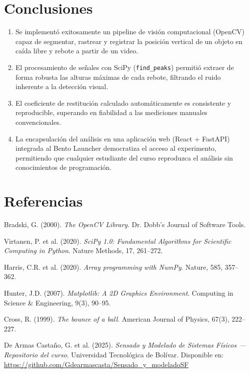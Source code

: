 \documentclass[12pt,a4paper]{article}
\begin{document}
\section{Conclusiones}

\begin{enumerate}
    \item Se implementó exitosamente un pipeline de visión computacional (OpenCV) capaz de segmentar, rastrear y registrar la posición vertical de un objeto en caída libre y rebote a partir de un video.

    \item El procesamiento de señales con SciPy (\texttt{find\_peaks}) permitió extraer de forma robusta las alturas máximas de cada rebote, filtrando el ruido inherente a la detección visual.

    \item El coeficiente de restitución calculado automáticamente es consistente y reproducible, superando en fiabilidad a las mediciones manuales convencionales.

    \item La encapsulación del análisis en una aplicación web (React + FastAPI) integrada al Bento Launcher democratiza el acceso al experimento, permitiendo que cualquier estudiante del curso reproduzca el análisis sin conocimientos de programación.

\end{enumerate}

\section*{Referencias}

\begin{enumerate}[label={[\arabic*]}]
    \item Bradski, G. (2000). \textit{The OpenCV Library}. Dr. Dobb's Journal of Software Tools.
    \item Virtanen, P. et al. (2020). \textit{SciPy 1.0: Fundamental Algorithms for Scientific Computing in Python}. Nature Methods, 17, 261--272.
    \item Harris, C.R. et al. (2020). \textit{Array programming with NumPy}. Nature, 585, 357--362.
    \item Hunter, J.D. (2007). \textit{Matplotlib: A 2D Graphics Environment}. Computing in Science \& Engineering, 9(3), 90--95.
    \item Cross, R. (1999). \textit{The bounce of a ball}. American Journal of Physics, 67(3), 222--227.
    \item De Armas Castaño, G. et al. (2025). \textit{Sensado y Modelado de Sistemas Físicos — Repositorio del curso}. Universidad Tecnológica de Bolívar. Disponible en: \url{https://github.com/Gdearmascasta/Sensado_y_modeladoSF}
\end{enumerate}
\end{document}

